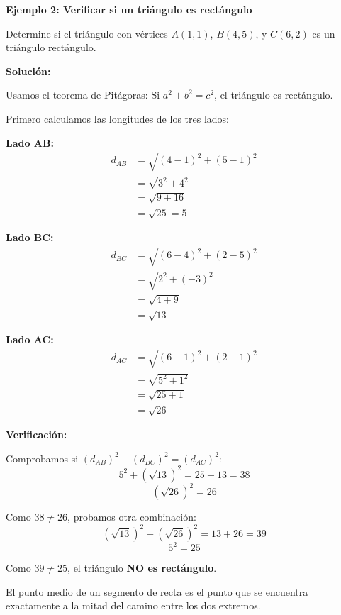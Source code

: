 \newpage

\begin{example}
\textbf{Ejemplo 2: Verificar si un triángulo es rectángulo}

Determine si el triángulo con vértices $A(1, 1)$, $B(4, 5)$, y $C(6, 2)$ es un triángulo rectángulo.

\textbf{Solución:}

Usamos el teorema de Pitágoras: Si $a^2 + b^2 = c^2$, el triángulo es rectángulo.

Primero calculamos las longitudes de los tres lados:

\textbf{Lado AB:}
\begin{align*}
d_{AB} &= \sqrt{(4-1)^2 + (5-1)^2} \\
       &= \sqrt{3^2 + 4^2} \\
       &= \sqrt{9 + 16} \\
       &= \sqrt{25} = 5
\end{align*}

\textbf{Lado BC:}
\begin{align*}
d_{BC} &= \sqrt{(6-4)^2 + (2-5)^2} \\
       &= \sqrt{2^2 + (-3)^2} \\
       &= \sqrt{4 + 9} \\
       &= \sqrt{13}
\end{align*}

\textbf{Lado AC:}
\begin{align*}
d_{AC} &= \sqrt{(6-1)^2 + (2-1)^2} \\
       &= \sqrt{5^2 + 1^2} \\
       &= \sqrt{25 + 1} \\
       &= \sqrt{26}
\end{align*}

\textbf{Verificación:}

Comprobamos si $(d_{AB})^2 + (d_{BC})^2 = (d_{AC})^2$:
$$5^2 + (\sqrt{13})^2 = 25 + 13 = 38$$
$$(\sqrt{26})^2 = 26$$

Como $38 \neq 26$, probamos otra combinación:
$$(\sqrt{13})^2 + (\sqrt{26})^2 = 13 + 26 = 39$$
$$5^2 = 25$$

Como $39 \neq 25$, el triángulo \textbf{NO es rectángulo}.
\end{example}


El punto medio de un segmento de recta es el punto que se encuentra exactamente a la mitad del camino entre los dos extremos.

